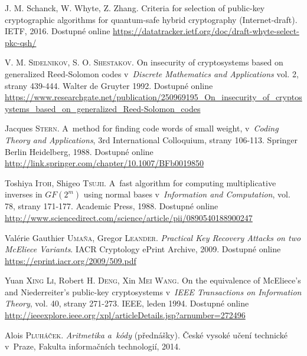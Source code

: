 \documentclass[thesis=M,czech,hidelinks]{FITthesis}[2012/06/26]
\newcommand{\0}{{\textcolor[gray]{0.75}{0}}}
\begin{document}
\begin{thebibliography}{99}
        J. M. Schanck, W. Whyte, Z. Zhang. Criteria for selection of public-key
        cryptographic algorithms for quantum-safe hybrid cryptography
        (Internet-draft). IETF, 2016. Dostupné online
        \url{https://datatracker.ietf.org/doc/draft-whyte-select-pkc-qsh/}

        V. M. \textsc{Sidelnikov}, S. O. \textsc{Shestakov}. On insecurity of
        cryptosystems based on generalized Reed-Solomon codes v~\emph{Discrete
        Mathematics and Applications} vol. 2, strany 439-444. Walter de Gruyter
        1992. Dostupné online
        \url{https://www.researchgate.net/publication/250969195\_On\_insecurity\_of\_cryptosystems\_based\_on\_generalized\_Reed-Solomon\_codes}

        Jacques \textsc{Stern}. A~method for finding code words of small weight,
        v~\emph{Coding Theory and Applications}, 3rd International Colloquium,
        strany 106-113. Springer Berlin Heidelberg, 1988. Dostupné online
        \url{http://link.springer.com/chapter/10.1007/BFb0019850}

        Toshiya \textsc{Itoh}, Shigeo \textsc{Tsujii}. A~fast algorithm for
        computing multiplicative inverses in $GF(2^m)$ using normal bases
        v~\emph{Information and Computation}, vol. 78, strany 171-177. Academic
        Press, 1988.  Dostupné online
        \url{http://www.sciencedirect.com/science/article/pii/0890540188900247}

        Valérie Gauthier \textsc{Umaña}, Gregor \textsc{Leander}.
        \emph{Practical Key Recovery Attacks on two McEliece Variants}.
        IACR Cryptology ePrint Archive, 2009.  Dostupné online
        \url{https://eprint.iacr.org/2009/509.pdf}

        Yuan \textsc{Xing Li}, Robert H. \textsc{Deng}, Xin \textsc{Mei Wang}.
        On the equivalence of McEliece's and Niederreiter's public-key
        cryptosystems v~\emph{IEEE Transactions on Information Theory}, vol. 40,
        strany 271-273. IEEE, leden 1994. Dostupné online
        \url{http://ieeexplore.ieee.org/xpl/articleDetails.jsp?arnumber=272496}


        Alois \textsc{Pluháček}. \emph{Aritmetika a~kódy} (přednášky).
        České vysoké učení technické v~Praze, Fakulta informačních technologií,
        2014.


\end{thebibliography}
\end{document}
